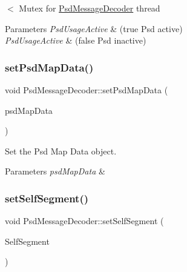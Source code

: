 $<$ Mutex for \hyperlink{class_psd_message_decoder}{Psd\+Message\+Decoder} thread 
\begin{DoxyParams}{Parameters}
{\em Psd\+Usage\+Active} & (true Psd active) \\
\hline
{\em Psd\+Usage\+Active} & (false Psd inactive) \\
\hline
\end{DoxyParams}
\mbox{\label{class_psd_message_decoder_a6c92018754baf45e25e682cd153864af}} 
\subsubsection{\texorpdfstring{set\+Psd\+Map\+Data()}{setPsdMapData()}}
{\footnotesize\ttfamily void Psd\+Message\+Decoder\+::set\+Psd\+Map\+Data (\begin{DoxyParamCaption}\item[{\hyperlink{_psd_message_decoder_8h_ad54e183dd7c544312c06d4bd6279ebdc}{t\+Psd\+Map\+Data}}]{psd\+Map\+Data }\end{DoxyParamCaption})}



Set the Psd Map Data object. 


\begin{DoxyParams}{Parameters}
{\em psd\+Map\+Data} & \\
\hline
\end{DoxyParams}
\mbox{\label{class_psd_message_decoder_ad9dd4ec66688adb0616b97de091aa6e7}} 
\subsubsection{\texorpdfstring{set\+Self\+Segment()}{setSelfSegment()}}
{\footnotesize\ttfamily void Psd\+Message\+Decoder\+::set\+Self\+Segment (\begin{DoxyParamCaption}\item[{\hyperlink{_psd_message_decoder_8h_a6c858ba8556a68d900d0eca9dc406232}{t\+Self\+Segment}}]{Self\+Segment }\end{DoxyParamCaption})}



